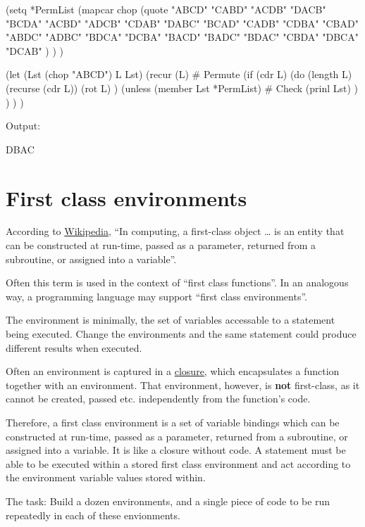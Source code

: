 \begin{wideverbatim}

(setq *PermList
   (mapcar chop
      (quote
         "ABCD" "CABD" "ACDB" "DACB" "BCDA" "ACBD" "ADCB" "CDAB"
         "DABC" "BCAD" "CADB" "CDBA" "CBAD" "ABDC" "ADBC" "BDCA"
         "DCBA" "BACD" "BADC" "BDAC" "CBDA" "DBCA" "DCAB" ) ) )

(let (Lst (chop "ABCD")  L Lst)
   (recur (L)  # Permute
      (if (cdr L)
         (do (length L)
            (recurse (cdr L))
            (rot L) )
         (unless (member Lst *PermList)  # Check
            (prinl Lst) ) ) ) )

Output:

DBAC

\end{wideverbatim}

\pagebreak{}
\section*{First class environments}

According to
\href{http://en.wikipedia.org/wiki/First-class\_object}{Wikipedia}, ``In
computing, a first-class object \ldots{} is an entity that can be
constructed at run-time, passed as a parameter, returned from a
subroutine, or assigned into a variable''.

Often this term is used in the context of ``first class functions''. In
an analogous way, a programming language may support ``first class
environments''.

The environment is minimally, the set of variables accessable to a
statement being executed. Change the environments and the same statement
could produce different results when executed.

Often an environment is captured in a
\href{http://en.wikipedia.org/wiki/Closure\_(computer\_science)}{closure},
which encapsulates a function together with an environment. That
environment, however, is \textbf{not} first-class, as it cannot be
created, passed etc. independently from the function's code.

Therefore, a first class environment is a set of variable bindings which
can be constructed at run-time, passed as a parameter, returned from a
subroutine, or assigned into a variable. It is like a closure without
code. A statement must be able to be executed within a stored first
class environment and act according to the environment variable values
stored within.

The task: Build a dozen environments, and a single piece of code to be
run repeatedly in each of these envionments.

